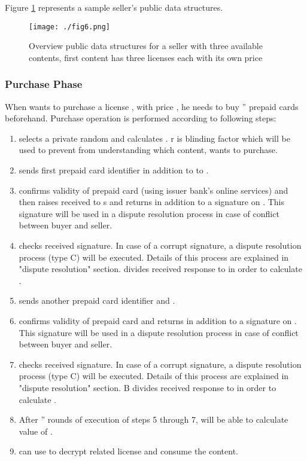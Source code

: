 \documentclass[times]{secauth}
\begin{document}
Figure \ref{fig_datastructure} represents a sample seller's public data structures.

\begin{figure}
\centering
\texttt{[image: ./fig6.png]}
\caption{Overview public data structures for a seller with three available contents, first content has three licenses each with its own price}
\label{fig_datastructure}
\end{figure}

\subsubsection{Purchase Phase}
When  wants to purchase a license , with price , he needs to buy '' prepaid cards beforehand. Purchase operation is performed according to following steps:
\begin{enumerate}
\item  selects a private random  and calculates . r is blinding factor which will be used to prevent  from understanding which content,  wants to purchase.
\item  sends first prepaid card identifier in addition to  to .
\item  confirms validity of prepaid card (using issuer bank's online services) and then raises received  to s and returns   in addition to a signature on . This signature will be used in a dispute resolution process in case of conflict between buyer and seller.
\item  checks received signature. In case of a corrupt signature, a dispute resolution process (type C) will be executed. Details of this process are explained in "dispute resolution" section.  divides received response to  in order to calculate .
\item  sends another prepaid card identifier and .
\item  confirms validity of prepaid card and returns  in addition to a signature on . This signature will be used in a dispute resolution process in case of conflict between buyer and seller.
\item  checks received signature. In case of a corrupt signature, a dispute resolution process (type C) will be executed. Details of this process are explained in "dispute resolution" section. B divides received response to  in order to calculate .
\item After '' rounds of execution of steps 5 through 7,  will be able to calculate value of .
\item  can use  to decrypt related license and consume the content.
\end{enumerate}
	
\end{document}
